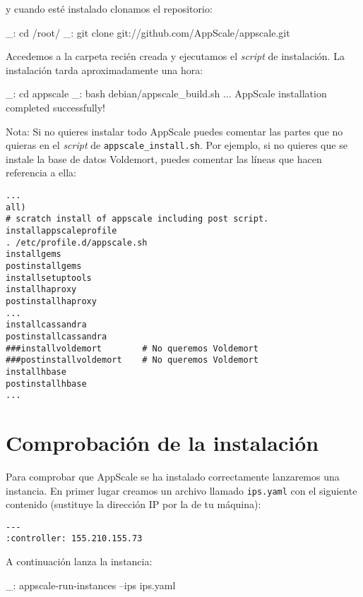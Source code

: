 y cuando esté instalado clonamos el repositorio:

\begin{bashcode}
_: cd /root/
_: git clone git://github.com/AppScale/appscale.git
\end{bashcode}

Accedemos a la carpeta recién creada y ejecutamos el \emph{script} de instalación. La instalación tarda aproximadamente una hora:

\begin{bashcode}
_: cd appscale
_: bash debian/appscale_build.sh
...
AppScale installation completed successfully!
\end{bashcode}

Nota: Si no quieres instalar todo AppScale puedes comentar las partes que no quieras en el \emph{script} de \texttt{appscale\_install.sh}. Por ejemplo, si no quieres que se instale la base de datos Voldemort, puedes comentar las líneas que hacen referencia a ella:

\begin{lstlisting}
...
all)
# scratch install of appscale including post script.
installappscaleprofile
. /etc/profile.d/appscale.sh
installgems
postinstallgems
installsetuptools
installhaproxy
postinstallhaproxy
...
installcassandra
postinstallcassandra
###installvoldemort        # No queremos Voldemort
###postinstallvoldemort    # No queremos Voldemort
installhbase
postinstallhbase
...
\end{lstlisting}


\section{Comprobación de la instalación}

Para comprobar que AppScale se ha instalado correctamente lanzaremos una instancia. En primer lugar creamos un archivo llamado \texttt{ips.yaml} con el siguiente contenido (sustituye la dirección IP por la de tu máquina):

\begin{lstlisting}
--- 
:controller: 155.210.155.73
\end{lstlisting}

A continuación lanza la instancia:

\begin{bashcode}
_: appscale-run-instances --ips ips.yaml
\end{bashcode}


